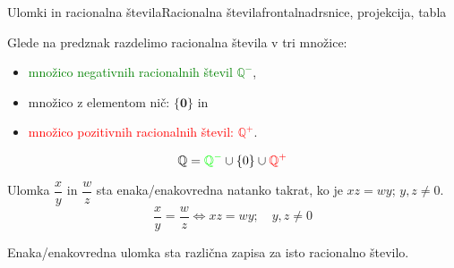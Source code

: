 \begin{priprava}{1}{}{Ulomki in racionalna števila}{Racionalna števila}{frontalna}{drsnice, projekcija, tabla}
\begin{figure}[H]
                \end{figure}
                    
            

            
                Glede na predznak razdelimo racionalna števila v tri množice:
                \begin{itemize}
                    \item \textcolor{green}{množico negativnih racionalnih števil $\mathbf{\mathbb{Q}^-}$},
                    \item množico z elementom nič: $\mathbf{\{0\}}$ in
                    \item \textcolor{red}{množico pozitivnih racionalnih števil: $\mathbf{\mathbb{Q}^+}$}.
                \end{itemize}
                $$ \mathbb{Q}=\textcolor{green}{\mathbb{Q}^-}\cup\{0\}\cup\textcolor{red}{\mathbb{Q}^+} $$
            
            


        

        
            
                Ulomka $\dfrac{x}{y}$ in $\dfrac{w}{z}$ sta enaka/enakovredna natanko takrat, ko je $xz=wy$; $y,z\neq 0$.
                $$\dfrac{x}{y}=\dfrac{w}{z}\Leftrightarrow xz=wy; \quad y,z\neq 0$$
            

            
                Enaka/enakovredna ulomka sta različna zapisa za isto racionalno število.
            
        ~\\




        \begin{multicols}{2}


\end{multicols}
\end{priprava}
